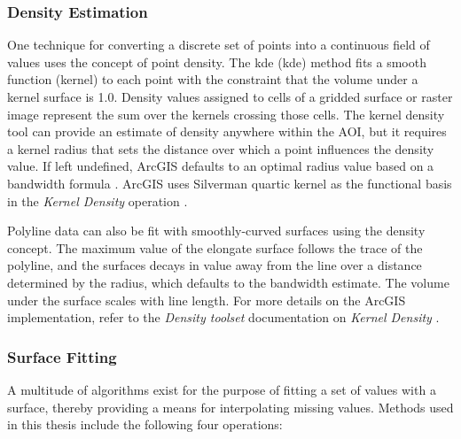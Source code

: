 \subsubsection{Density Estimation}\label{ch3:density_est}
One technique for converting a discrete set of points into a continuous field of values uses the concept of point density. The \acrlong{kde} (\acrshort{kde}) method fits a smooth function (kernel) to each point with the constraint that the volume under a kernel surface is 1.0. Density values assigned to cells of a gridded surface or raster image represent the sum over the kernels crossing those cells. The kernel density tool can provide an estimate of density anywhere within the AOI, but it requires a kernel radius that sets the distance over which a point influences the density value. If left undefined, ArcGIS defaults to an optimal radius value based on a bandwidth formula \citep{esri_kernel_2021}. ArcGIS uses Silverman quartic kernel as the functional basis in the \textit{Kernel Density} operation \citep{esri_kernel_2021,silverman_density_1986}.

Polyline data can also be fit with smoothly-curved surfaces using the density concept. The maximum value of the elongate surface follows the trace of the polyline, and the surfaces decays in value away from the line over a distance determined by the radius, which defaults to the bandwidth estimate. The volume under the surface scales with line length. For more details on the ArcGIS implementation, refer to the \textit{Density toolset} documentation on \textit{Kernel Density} \citep{esri_kernel_2021}.

\subsubsection{Surface Fitting}\label{ch3:surface_fit}
A multitude of algorithms exist for the purpose of fitting a set of values with a surface, thereby providing a means for interpolating missing values. Methods used in this thesis include the following four operations:

